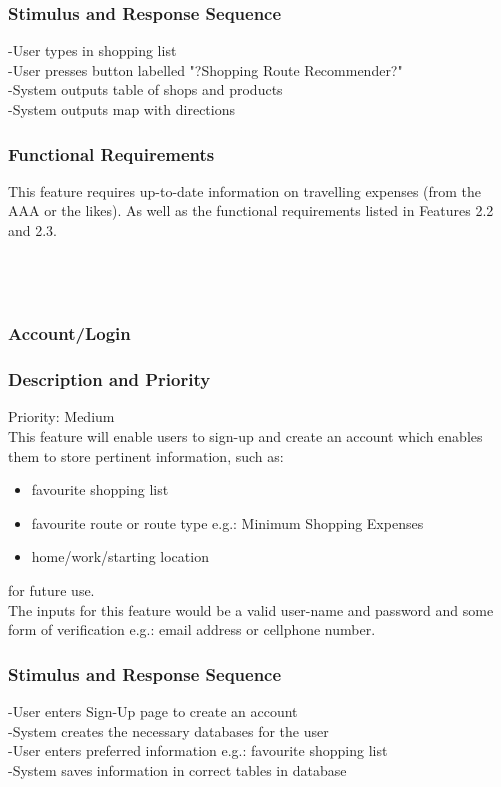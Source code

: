 \documentclass[12pt]{article}
\begin{document}
 \subsubsection*{Stimulus and Response Sequence}
 -User types in shopping list\\
-User presses button labelled "?Shopping Route Recommender?"\\
-System outputs table of shops and products\\
-System outputs map with directions\\
 \subsubsection*{Functional Requirements}
 This feature requires up-to-date information on travelling expenses (from the AAA or the likes).
 As well as the functional requirements listed in Features 2.2 and 2.3.
 \\
 \\
 \\
 \\
 \subsubsection{Account/Login}
\subsubsection*{Description and Priority}
 Priority: Medium\\
 This feature will enable users to sign-up and create an account which enables them to store pertinent information, such as:\begin{itemize}
  \item favourite shopping list
  \item favourite route or route type e.g.: Minimum Shopping Expenses
  \item home/work/starting location
\end{itemize}
for future use. \\
The inputs for this feature would be a valid user-name and password and some form of verification e.g.: email address or cellphone number. 
      
 \subsubsection*{Stimulus and Response Sequence}
-User enters Sign-Up page to create an account \\
-System creates the necessary databases for the user\\
-User enters preferred information e.g.: favourite shopping list\\
-System saves information in correct tables in database
\end{document}
